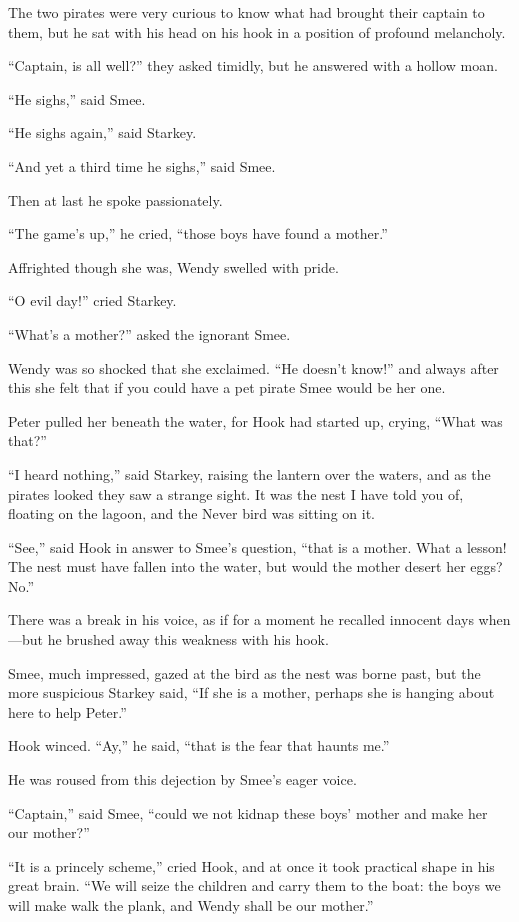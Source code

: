 The two pirates were very curious to know what had brought their
captain to them, but he sat with his head on his hook in a position of
profound melancholy.

``Captain, is all well?'' they asked timidly, but he answered with a
hollow moan.

``He sighs,'' said Smee.

``He sighs again,'' said Starkey.

``And yet a third time he sighs,'' said Smee.

Then at last he spoke passionately.

``The game's up,'' he cried, ``those boys have found a mother.''

Affrighted though she was, Wendy swelled with pride.

``O evil day!'' cried Starkey.

``What's a mother?'' asked the ignorant Smee.

Wendy was so shocked that she exclaimed. ``He doesn't know!'' and always
after this she felt that if you could have a pet pirate Smee would be
her one.

Peter pulled her beneath the water, for Hook had started up, crying,
``What was that?''

``I heard nothing,'' said Starkey, raising the lantern over the waters,
and as the pirates looked they saw a strange sight. It was the nest I
have told you of, floating on the lagoon, and the Never bird was
sitting on it.

``See,'' said Hook in answer to Smee's question, ``that is a mother. What
a lesson! The nest must have fallen into the water, but would the
mother desert her eggs? No.''

There was a break in his voice, as if for a moment he recalled innocent
days when---but he brushed away this weakness with his hook.

Smee, much impressed, gazed at the bird as the nest was borne past, but
the more suspicious Starkey said, ``If she is a mother, perhaps she is
hanging about here to help Peter.''

Hook winced. ``Ay,'' he said, ``that is the fear that haunts me.''

He was roused from this dejection by Smee's eager voice.

``Captain,'' said Smee, ``could we not kidnap these boys' mother and make
her our mother?''

``It is a princely scheme,'' cried Hook, and at once it took practical
shape in his great brain. ``We will seize the children and carry them to
the boat: the boys we will make walk the plank, and Wendy shall be our
mother.''


